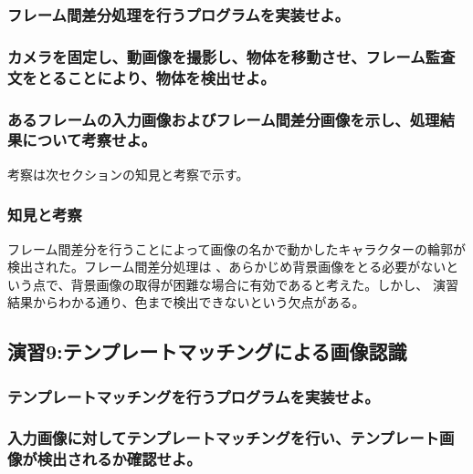 ﻿\documentclass[a4j,11pt]{jarticle}
\begin{document}
\subsubsection{フレーム間差分処理を行うプログラムを実装せよ。}
\subsubsection{カメラを固定し、動画像を撮影し、物体を移動させ、フレーム監査文をとることにより、物体を検出せよ。}
\subsubsection{あるフレームの入力画像およびフレーム間差分画像を示し、処理結果について考察せよ。}
考察は次セクションの知見と考察で示す。
\subsubsection{知見と考察}
フレーム間差分を行うことによって画像の名かで動かしたキャラクターの輪郭が検出された。フレーム間差分処理は
、あらかじめ背景画像をとる必要がないという点で、背景画像の取得が困難な場合に有効であると考えた。しかし、
演習結果からわかる通り、色まで検出できないという欠点がある。
\subsection{演習9:テンプレートマッチングによる画像認識}

\subsubsection{テンプレートマッチングを行うプログラムを実装せよ。}
\subsubsection{入力画像に対してテンプレートマッチングを行い、テンプレート画像が検出されるか確認せよ。}
\end{document}

